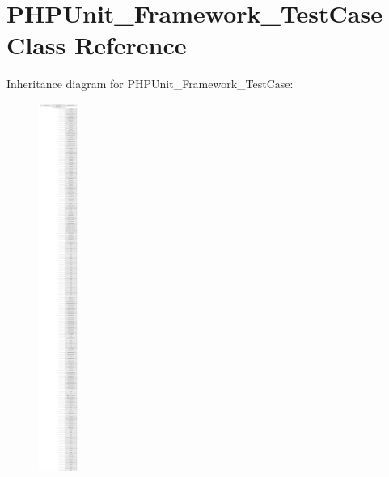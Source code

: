 \hypertarget{class_p_h_p_unit___framework___test_case}{}\section{P\+H\+P\+Unit\+\_\+\+Framework\+\_\+\+Test\+Case Class Reference}
\label{class_p_h_p_unit___framework___test_case}
Inheritance diagram for P\+H\+P\+Unit\+\_\+\+Framework\+\_\+\+Test\+Case\+:\begin{figure}[H]
\begin{center}
\leavevmode
\includegraphics[height=12.000000cm]{class_p_h_p_unit___framework___test_case}
\end{center}
\end{figure}
